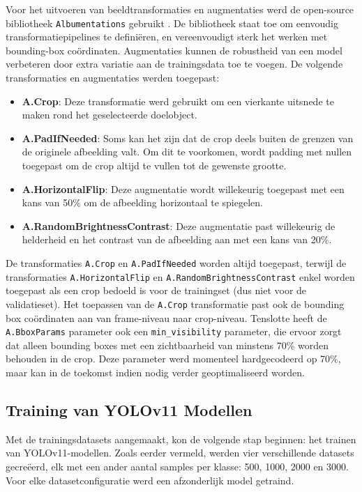 Voor het uitvoeren van beeldtransformaties en augmentaties werd de open-source bibliotheek \texttt{Albumentations} gebruikt \autocite{Buslaev2018}.
De bibliotheek staat toe om eenvoudig transformatiepipelines te definiëren, en vereenvoudigt sterk het werken met bounding-box coördinaten.
Augmentaties kunnen de robustheid van een model verbeteren door extra variatie aan de trainingsdata toe te voegen.
De volgende transformaties en augmentaties werden toegepast:
\begin{itemize}
    \item \textbf{A.Crop}: Deze transformatie werd gebruikt om een vierkante uitsnede te maken rond het geselecteerde doelobject.
    \item \textbf{A.PadIfNeeded}: Soms kan het zijn dat de crop deels buiten de grenzen van de originele afbeelding valt.
    Om dit te voorkomen, wordt padding met nullen toegepast om de crop altijd te vullen tot de gewenste grootte.
    \item \textbf{A.HorizontalFlip}: Deze augmentatie wordt willekeurig toegepast met een kans van 50\% om de afbeelding horizontaal te spiegelen.
    \item \textbf{A.RandomBrightnessContrast}: Deze augmentatie past willekeurig de helderheid en het contrast van de afbeelding aan met een kans van 20\%.
\end{itemize}
De transformaties \texttt{A.Crop} en \texttt{A.PadIfNeeded} worden altijd toegepast,
terwijl de transformaties \texttt{A.HorizontalFlip} en \texttt{A.RandomBrightnessContrast} 
enkel worden toegepast als een crop bedoeld is voor de trainingset (dus niet voor de validatieset).
Het toepassen van de \texttt{A.Crop} transformatie past ook de bounding box coördinaten aan van frame-niveau naar crop-niveau.
Tenslotte heeft de \texttt{A.BboxParams} parameter ook een \texttt{min\_visibility} parameter, die ervoor zorgt dat alleen bounding boxes
met een zichtbaarheid van minstens 70\% worden behouden in de crop.
Deze parameter werd momenteel hardgecodeerd op 70\%, maar kan in de toekomst indien nodig verder geoptimaliseerd worden.

\subsection{Training van YOLOv11 Modellen}

Met de trainingsdatasets aangemaakt, kon de volgende stap beginnen: het trainen van YOLOv11-modellen.
Zoals eerder vermeld, werden vier verschillende datasets gecreëerd, elk met een ander aantal samples per klasse: 500, 1000, 2000 en 3000.
Voor elke datasetconfiguratie werd een afzonderlijk model getraind.

